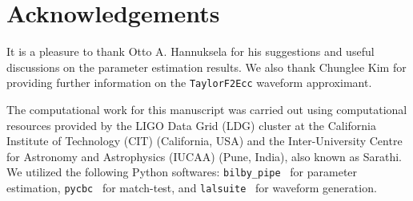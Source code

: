 \documentclass[aps,prd,twocolumn,superscriptaddress,groupedaddress,nofootinbib,showpacs,eqsecnum,useAms]{revtex4-2}
\begin{document}
\section{Acknowledgements}\label{acknowledgements}

It is a pleasure to thank Otto A. Hannuksela for his suggestions and useful discussions on the parameter estimation results. We also thank Chunglee Kim for providing further information on the \texttt{TaylorF2Ecc} waveform approximant.

The computational work for this manuscript was carried out using computational resources provided by the LIGO Data Grid (LDG) cluster at the California Institute of Technology (CIT) (California, USA) and the Inter-University Centre for Astronomy and Astrophysics (IUCAA) (Pune, India), also known as Sarathi. We utilized the following Python softwares: \texttt{bilby\_pipe}~\cite{bilby_pipe_paper} for parameter estimation, \texttt{pycbc}~\cite{pycbc} for match-test, and \texttt{lalsuite}~\cite{lalsuite} for waveform generation.
\end{document}
